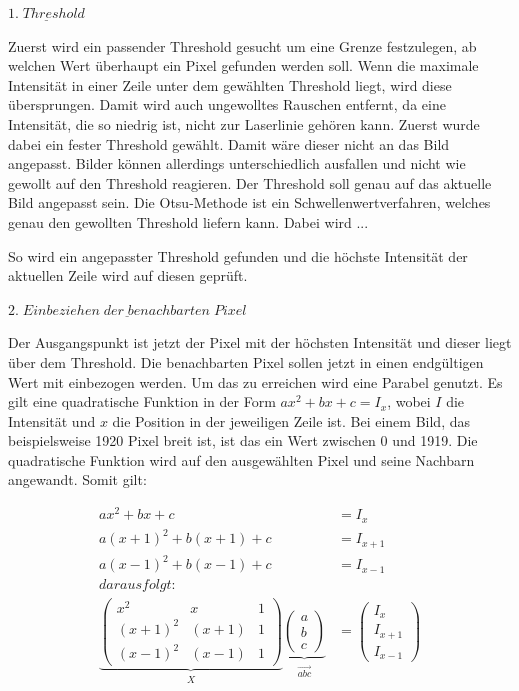 		$\underline{1. \; Threshold}$
		
		Zuerst wird ein passender Threshold gesucht um eine Grenze festzulegen, ab welchen Wert überhaupt ein Pixel gefunden werden soll. Wenn die maximale Intensität in einer Zeile unter dem gewählten Threshold liegt, wird diese übersprungen. Damit wird auch ungewolltes Rauschen entfernt, da eine Intensität, die so niedrig ist, nicht zur Laserlinie gehören kann. Zuerst wurde dabei ein fester Threshold gewählt. Damit wäre dieser nicht an das Bild angepasst. Bilder können allerdings unterschiedlich ausfallen und nicht wie gewollt auf den Threshold reagieren. Der Threshold soll genau auf das aktuelle Bild angepasst sein. Die Otsu-Methode ist ein Schwellenwertverfahren, welches genau den gewollten Threshold liefern kann. Dabei wird ...
		
		So wird ein angepasster Threshold gefunden und die höchste Intensität der aktuellen Zeile wird auf diesen geprüft.
		
		$\underline{2. \; Einbeziehen \; der \; benachbarten \; Pixel}$
		
		Der Ausgangspunkt ist jetzt der Pixel mit der höchsten Intensität und dieser liegt über dem Threshold. Die benachbarten Pixel sollen jetzt in einen endgültigen Wert mit einbezogen werden. Um das zu erreichen wird eine Parabel genutzt. Es gilt eine quadratische Funktion in der Form \( ax^2 + bx + c = I_x \), wobei \( I \) die Intensität und \( x \) die Position in der jeweiligen Zeile ist. Bei einem Bild, das beispielsweise 1920 Pixel breit ist, ist das ein Wert zwischen 0 und 1919. Die quadratische Funktion wird auf den ausgewählten Pixel und seine Nachbarn angewandt. Somit gilt:
		
		\begin{equation}
			\begin{aligned}
				ax^2 + bx + c &= I_x \\
				a(x+1)^2 + b(x+1) + c &= I_{x+1} \\
				a(x-1)^2 + b(x-1) + c &= I_{x-1} \\
				daraus folgt: \\
				\underbrace{\begin{pmatrix}
					x^2 & x & 1 \\
					(x+1)^2 & (x+1) & 1 \\
					(x-1)^2 & (x-1) & 1 
				\end{pmatrix}}_{\substack{X}} \underbrace{ \begin{pmatrix}
					a \\
					b \\
					c
				\end{pmatrix}}_{\substack{\vec{abc}}} &= \begin{pmatrix}
					I_x \\
					I_{x+1} \\
					I_{x-1}
				\end{pmatrix}
			\end{aligned}
			\label{eq:subpixel_x}
		\end{equation}
		
